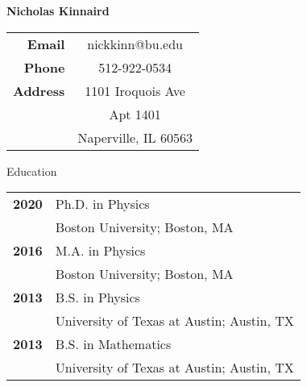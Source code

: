
\thispagestyle{myheadings}

\begin{center}
{\Large {\bf Nicholas Kinnaird}}
\end{center}


\begin{center}
\begin{tabular}{rc}
  {\bf Email}   & nickkinn@bu.edu\\
  {\bf Phone}   & 512-922-0534\\
  {\bf Address} & 1101 Iroquois Ave\\
                & Apt 1401\\
                & Naperville, IL 60563
\end{tabular}
\end{center}


\begin{center}
\vspace{0.3in}
{\large Education\\}
\vspace{0.3in}
\begin{tabular}{rl}
  {\bf 2020} & Ph.D. in Physics\\
             & Boston University; Boston, MA\\
  {\bf 2016} & M.A. in Physics\\
             & Boston University; Boston, MA\\
  {\bf 2013} & B.S. in Physics\\
             & University of Texas at Austin; Austin, TX\\
  {\bf 2013} & B.S. in Mathematics\\
             & University of Texas at Austin; Austin, TX\\
\end{tabular}
\end{center}



